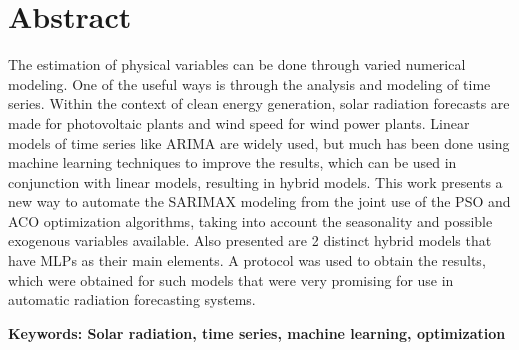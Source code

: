 \chapter*{Abstract}

The estimation of physical variables can be done through varied numerical modeling. One of the useful ways is through the analysis and modeling of time series. Within the context of clean energy generation, solar radiation forecasts are made for photovoltaic plants and wind speed for wind power plants. Linear models of time series like ARIMA are widely used, but much has been done using machine learning techniques to improve the results, which can be used in conjunction with linear models, resulting in hybrid models. This work presents a new way to automate the SARIMAX modeling from the joint use of the PSO and ACO optimization algorithms, taking into account the seasonality and possible exogenous variables available. Also presented are 2 distinct hybrid models that have MLPs as their main elements. A protocol was used to obtain the results, which were obtained for such models that were very promising for use in automatic radiation forecasting systems.

\noindent\par\vspace{1em}
\noindent\textbf{Keywords: Solar radiation, time series, machine learning, optimization}